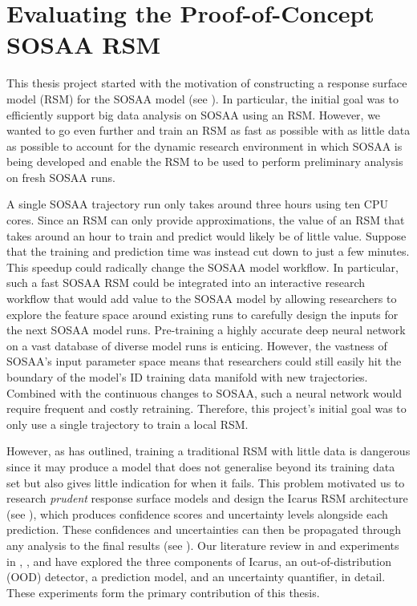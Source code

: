 \chapter{Evaluating the Proof-of-Concept SOSAA RSM} \label{txt:icarus-evaluation-chapter}

This thesis project started with the motivation of constructing a response surface model (RSM) for the SOSAA model (see ). In particular, the initial goal was to efficiently support big data analysis on SOSAA using an RSM. However, we wanted to go even further and train an RSM as fast as possible with as little data as possible to account for the dynamic research environment in which SOSAA is being developed and enable the RSM to be used to perform preliminary analysis on fresh SOSAA runs.

A single SOSAA trajectory run only takes around three hours using ten CPU cores. Since an RSM can only provide approximations, the value of an RSM that takes around an hour to train and predict would likely be of little value. Suppose that the training and prediction time was instead cut down to just a few minutes. This speedup could radically change the SOSAA model workflow. In particular, such a fast SOSAA RSM could be integrated into an interactive research workflow that would add value to the SOSAA model by allowing researchers to explore the feature space around existing runs to carefully design the inputs for the next SOSAA model runs. Pre-training a highly accurate deep neural network on a vast database of diverse model runs is enticing. However, the vastness of SOSAA's input parameter space means that researchers could still easily hit the boundary of the model's ID training data manifold with new trajectories. Combined with the continuous changes to SOSAA, such a neural network would require frequent and costly retraining. Therefore, this project's initial goal was to only use a single trajectory to train a local RSM.

However, as  has outlined, training a traditional RSM with little data is dangerous since it may produce a model that does not generalise beyond its training data set but also gives little indication for when it fails. This problem motivated us to research \textit{prudent} response surface models and design the Icarus RSM architecture (see ), which produces confidence scores and uncertainty levels alongside each prediction. These confidences and uncertainties can then be propagated through any analysis to the final results (see ). Our literature review in  and experiments in , , and  have explored the three components of Icarus, an out-of-distribution (OOD) detector, a prediction model, and an uncertainty quantifier, in detail. These experiments form the primary contribution of this thesis.

